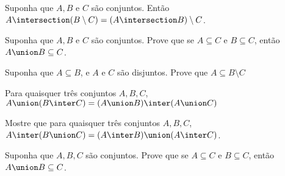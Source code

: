 \begin{exercise}
	Suponha que $A, B$ e $C$ são conjuntos. Então $A \intersection (B \setminus C) = (A \intersection B) \setminus C$.
\end{exercise}

\begin{exercise}
	Suponha que $A, B$ e $C$ são conjuntos. Prove que se $A \subseteq C$ e $B \subseteq C$, então $A \union B \subseteq C$.
\end{exercise}

\begin{exercise}
    Suponha que $A \subseteq B$, e $A$ e $C$ são disjuntos. Prove que $A \subseteq B \setminus C$
\end{exercise}

\begin{exercise}
    Para quaisquer três conjuntos $A, B, C$, $A \union (B \inter C) = (A \union B) \inter (A \union C)$
\end{exercise}

\begin{homework}
    Mostre que para quaisquer três conjuntos $A, B, C$, $A \inter (B \union C) = (A \inter B) \union (A \inter C)$.
\end{homework}

\begin{homework}
    Suponha que $A,B,C$ são conjuntos. Prove que se $A \subseteq C$ e $B \subseteq C$, então $A \union B \subseteq C$.
\end{homework}
